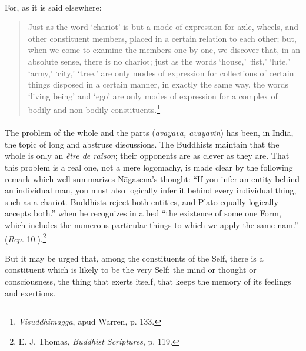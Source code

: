 \documentclass[a4paper, 11pt, oneside, english, landscape]{article}
\begin{document}
\paragraph{}
For, as it is said elsewhere:
\begin{quotation}
\small
Just as the word `chariot' is but a mode of expression for axle, wheels, and other constituent members, placed in a certain relation to each other; but, when we come to examine the members one by one, we discover that, in an absolute sense, there is no chariot; just as the words `house,' `fist,' `lute,' `army,' `city,' `tree,' are only modes of expression for collections of certain things disposed in a certain manner, in exactly the same way, the words `living being' and `ego' are only modes of expression for a complex of bodily and non-bodily constituents.\footnote{\emph{Visuddhimagga}, apud Warren, p. 133.}
\end{quotation}
\paragraph{}
The problem of the whole and the parts (\emph{avayava, avayavin}) has been, in India, the topic of long and abstruse discussions. The Buddhists maintain that the whole is only an \emph{être de raison}; their opponents are as clever as they are. That this problem is a real one, not a mere logomachy, is made clear by the following remark which well summarizes Nāgasena's thought: ``If you infer an entity behind an individual man, you must also logically infer it behind every individual thing, such as a chariot. Buddhists reject both entities, and Plato equally logically accepts both.'' when he recognizes in a bed ``the existence of some one Form, which includes the numerous particular things to which we apply the same nam.'' (\emph{Rep.} 10.).\footnote{E. J. Thomas, \emph{Buddhist Scriptures}, p. 119.}

But it may be urged that, among the constituents of the Self, there is a constituent which is likely to be the very Self: the mind or thought or consciousness, the thing that exerts itself, that keeps the memory of its feelings and exertions.
\end{document}
